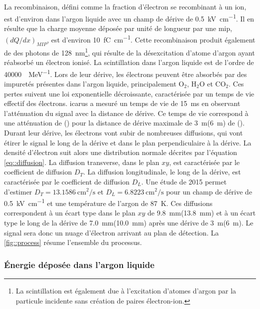         La recombinaison, défini comme la fraction d'électron se recombinant à un ion, est d'environ  dans l'argon liquide avec un champ de dérive de \SI{0.5}{\kilo\volt\per\centi\meter}. Il en résulte que la charge moyenne déposée par unité de longueur par une \gls{mip}, $(dQ/dx)_{MIP}$, est d'environ \SI{10}{\femto\coulomb\per\centi\meter}. Cette recombinaison produit également de des photons de \SI{128}{\nano\meter}\footnote{La scintillation est également due à l'excitation d'atomes d'argon par la particule incidente sans création de paires électron-ion.}, qui résulte de la désexcitation d'atome d'argon ayant réabsorbé un électron ionisé. La scintillation dans l'argon liquide est de l'ordre de \SI{40000}{\gamma\per\mega\eV}\cite{Cennini1999}. Lors de leur dérive, les électrons peuvent être absorbés par des impuretés présentes dans l'argon liquide, principalement O$_2$, H$_2$O et CO$_2$. Ces pertes suivent une loi exponentielle décroissante, caractérisée par un temps de vie effectif des électrons. \gls{icarus} a mesuré un temps de vie de \SI{15}{\milli\second}\cite{Antonello2014} en observant l'atténuation du signal avec la distance de dérive. Ce temps de vie correspond à une atténuation de () pour la distance de dérive maximale de \SI{3}{\meter}(\SI{6}{\meter}) de \protosp{}(\protodp{}). Durant leur dérive, les électrons vont subir de nombreuses diffusions, qui vont étirer le signal le long de la dérive et dans le plan perpendiculaire à la dérive. La densité d'électron suit alors une distribution normale décrites par l'équation \eqref{eq::diffusion}. La diffusion transverse, dans le plan $xy$, est caractérisée par le coefficient de diffusion $D_T$. La diffusion longitudinale, le long de la dérive, est caractérisée par le coefficient de diffusion $D_L$. Une étude de 2015\cite{Li2015} permet d'estimer $D_T=\SI{13.1586}{\centi\meter\squared\per\second}$ et $D_L=\SI{6.8223}{\centi\meter\squared\per\second}$ pour un champ de dérive de \SI{0.5}{\kilo\volt\per\centi\meter} et une température de l'argon de \SI{87}{\kelvin}. Ces diffusions correspondent à un écart type dans le plan $xy$ de \SI{9.8}{\milli\meter}(\SI{13.8}{\milli\meter}) et à un écart type le long de la dérive de \SI{7.0}{\milli\meter}(\SI{10.0}{\milli\meter}) après une dérive de \SI{3}{\meter}(\SI{6}{\meter}). Le signal sera donc un nuage d'électron arrivant au plan de détection. La \autoref{fig::process} résume l'ensemble du processus.

      \subsubsection{Énergie déposée dans l'argon liquide}

